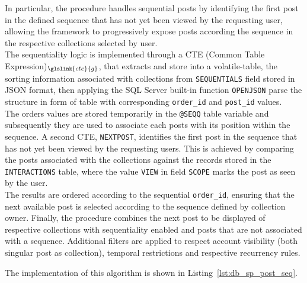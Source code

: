 In particular, the procedure handles sequential posts by identifying the first post in the defined sequence that has not yet been viewed by the requesting user, allowing the framework to progressively expose posts according the sequence in the respective collections selected by user. \\
The sequentiality logic is implemented through a CTE (Common Table Expression)$_{\glslink{cte}{g}}$, that extracts and store into a volatile-table, the sorting information associated with collections from \texttt{SEQUENTIALS} field stored in JSON format, then applying the SQL Server built-in function \texttt{OPENJSON} parse the structure in form of table with corresponding  \texttt{order\_id} and \texttt{post\_id} values. \\
The orders values are stored temporarily in the \texttt{@SEQQ} table variable and subsequently they are used to associate each posts with its position within the sequence. A second CTE, \texttt{NEXTPOST}, identifies the first post in the sequence that has not yet been viewed by the requesting users. This is achieved by comparing the posts associated with the collections against the records stored in the \texttt{INTERACTIONS} table, where the value \texttt{VIEW} in field \texttt{SCOPE} marks the post as seen by the user. \\
The results are ordered according to the sequential \texttt{order\_id}, ensuring that the next available post is selected according to the sequence defined by collection owner.
Finally, the procedure combines the next post to be displayed of respective collections with sequentiality enabled and posts that are not associated with a sequence. Additional filters are applied to respect account visibility (both singular post as collection), temporal restrictions and respective recurrency rules.

The implementation of this algorithm is shown in Listing~\ref{lst:db_sp_post_seq}.


